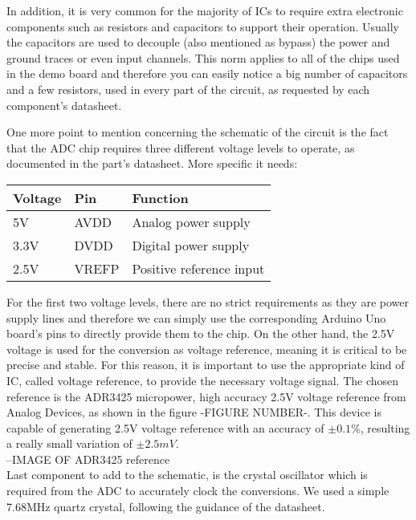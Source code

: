 In addition, it is very common for the majority of ICs to require extra electronic components such as resistors and capacitors to support their operation. Usually the capacitors are used to decouple (also mentioned as bypass) the power and ground traces or even input channels. This norm applies to all of the chips used in the demo board and therefore you can easily notice a big number of capacitors and a few resistors, used in every part of the circuit, as requested by each component's datasheet.

One more point to mention concerning the schematic of the circuit is the fact that the ADC chip requires three different voltage levels to operate, as documented in the part's datasheet. More specific it needs:

\begin{center}
\begin{tabular}{ l l l } 
 Voltage & Pin & Function \\ \hline
 5V & AVDD & Analog power supply \\ 
 3.3V & DVDD & Digital power supply \\
 2.5V & VREFP & Positive reference input \\ 
\end{tabular}
\end{center}

For the first two voltage levels, there are no strict requirements as they are power supply lines and therefore we can simply use the corresponding Arduino Uno board's pins to directly provide them to the chip. On the other hand, the 2.5V voltage is used for the conversion as voltage reference, meaning it is critical to be precise and stable. For this reason, it is important to use the appropriate kind of IC, called voltage reference, to provide the necessary voltage signal. The chosen reference is the ADR3425 micropower, high accuracy 2.5V voltage reference from Analog Devices, as shown in the figure -FIGURE NUMBER-. This device is capable of generating 2.5V voltage reference with an accuracy of $\pm 0.1\%$, resulting a really small variation of $\pm 2.5mV$.\\

--IMAGE OF ADR3425 reference\\

Last component to add to the schematic, is the crystal oscillator which is required from the ADC to accurately clock the conversions. We used a simple 7.68MHz quartz crystal, following the guidance of the datasheet.

